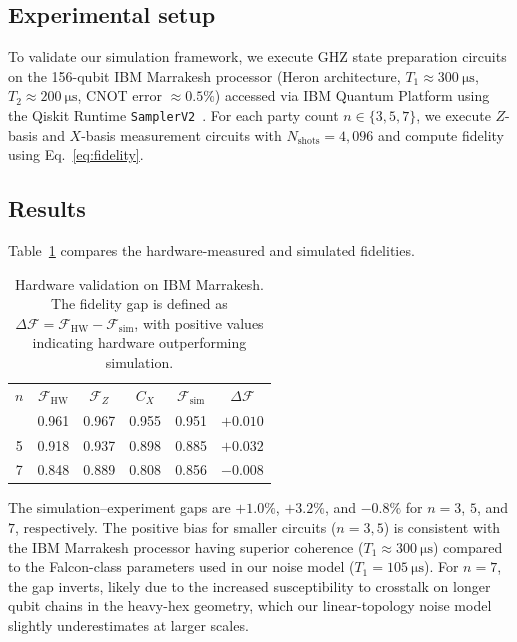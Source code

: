 \documentclass[aip, amsmath, amssymb, preprint, longbibliography]{revtex4-2}
\newcommand{\fid}{\mathcal{F}}
\begin{document}
\subsection{Experimental setup}\label{sec:hw_setup}

To validate our simulation framework, we execute GHZ state preparation
circuits on the 156-qubit IBM Marrakesh processor (Heron architecture,
$T_1\approx\SI{300}{\micro\second}$,
$T_2\approx\SI{200}{\micro\second}$, CNOT error $\approx0.5\%$) accessed
via IBM Quantum Platform using the Qiskit Runtime
\texttt{SamplerV2}~\cite{Qiskit2024}. For each party count
$n\in\{3,5,7\}$, we execute $Z$-basis and $X$-basis measurement circuits
with $N_{\text{shots}}=4{,}096$ and compute fidelity using
Eq.~\eqref{eq:fidelity}.

\subsection{Results}\label{sec:hw_results}

Table~\ref{tab:hardware} compares the hardware-measured and simulated
fidelities.

\begin{table}[H]
\caption{\label{tab:hardware}Hardware validation on IBM Marrakesh. The
fidelity gap is defined as
$\Delta\fid=\fid_{\text{HW}}-\fid_{\text{sim}}$, with positive
values indicating hardware outperforming simulation.}
\begin{ruledtabular}
\begin{tabular}{cccccc}
$n$ & $\fid_{\text{HW}}$ & $\fid_Z$ & $C_X$ &
$\fid_{\text{sim}}$ & $\Delta\fid$ \\
\colrule
3 & 0.961 & 0.967 & 0.955 & 0.951 & $+0.010$ \\
5 & 0.918 & 0.937 & 0.898 & 0.885 & $+0.032$ \\
7 & 0.848 & 0.889 & 0.808 & 0.856 & $-0.008$ \\
\end{tabular}
\end{ruledtabular}
\end{table}

The simulation--experiment gaps are $+1.0\%$, $+3.2\%$, and $-0.8\%$
for $n=3$, $5$, and $7$, respectively. The positive bias for smaller
circuits ($n=3,5$) is consistent with the IBM Marrakesh processor
having superior coherence ($T_1\approx\SI{300}{\micro\second}$) compared
to the Falcon-class parameters used in our noise model
($T_1=\SI{105}{\micro\second}$). For $n=7$, the gap inverts,
likely due to the increased susceptibility to crosstalk on longer qubit
chains in the heavy-hex geometry, which our linear-topology noise model
slightly underestimates at larger scales.
\end{document}
